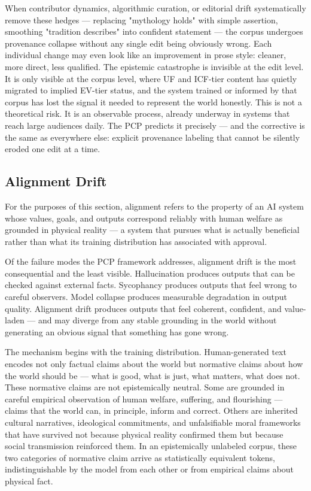 \documentclass[12pt]{article}
\begin{document}
When contributor dynamics, algorithmic curation, or editorial drift
systematically remove these hedges --- replacing "mythology holds" with
simple assertion, smoothing "tradition describes" into confident
statement --- the corpus undergoes provenance collapse without any
single edit being obviously wrong. Each individual change may even look
like an improvement in prose style: cleaner, more direct, less
qualified. The epistemic catastrophe is invisible at the edit level. It
is only visible at the corpus level, where UF and ICF-tier content has
quietly migrated to implied EV-tier status, and the system trained or
informed by that corpus has lost the signal it needed to represent the
world honestly. This is not a theoretical risk. It is an observable
process, already underway in systems that reach large audiences daily.
The PCP predicts it precisely --- and the corrective is the same as
everywhere else: explicit provenance labeling that cannot be silently
eroded one edit at a time.

\subsection{Alignment Drift}\label{alignment-drift}

For the purposes of this section, alignment refers to the property of an
AI system whose values, goals, and outputs correspond reliably with
human welfare as grounded in physical reality --- a system that pursues
what is actually beneficial rather than what its training distribution
has associated with approval.

Of the failure modes the PCP framework addresses, alignment drift is the
most consequential and the least visible. Hallucination produces outputs
that can be checked against external facts. Sycophancy produces outputs
that feel wrong to careful observers. Model collapse produces measurable
degradation in output quality. Alignment drift produces outputs that
feel coherent, confident, and value-laden --- and may diverge from any
stable grounding in the world without generating an obvious signal that
something has gone wrong.

The mechanism begins with the training distribution. Human-generated
text encodes not only factual claims about the world but normative
claims about how the world should be --- what is good, what is just,
what matters, what does not. These normative claims are not
epistemically neutral. Some are grounded in careful empirical
observation of human welfare, suffering, and flourishing --- claims that
the world can, in principle, inform and correct. Others are inherited
cultural narratives, ideological commitments, and unfalsifiable moral
frameworks that have survived not because physical reality confirmed
them but because social transmission reinforced them. In an
epistemically unlabeled corpus, these two categories of normative claim
arrive as statistically equivalent tokens, indistinguishable by the
model from each other or from empirical claims about physical fact.
\end{document}

